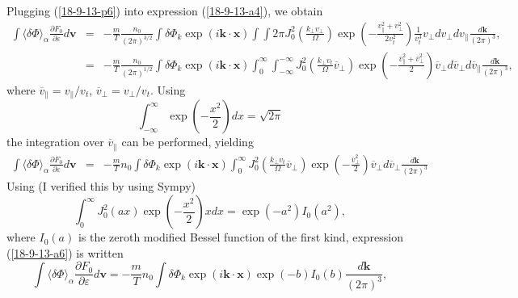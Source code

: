 \documentclass{article}
\begin{document}
Plugging (\ref{18-9-13-p6}) into expression (\ref{18-9-13-a4}), we obtain
\begin{eqnarray}
  \int \langle \delta \Phi \rangle_{\alpha} \frac{\partial F_0}{\partial
  \varepsilon} d\mathbf{v} & = & - \frac{m}{T}  \frac{n_0}{(2 \pi)^{3 / 2}}
  \int \delta \Phi_k \exp (i\mathbf{k} \cdot \mathbf{x}) \int \int 2 \pi J_0^2
  \left( \frac{k_{\perp} v_{\perp}}{\Omega} \right) \exp \left( -
  \frac{v^2_{\parallel} + v_{\perp}^2}{2 v_t^2} \right) \frac{1}{v_t^3}
  v_{\perp} d v_{\perp} d v_{\parallel} \frac{d\mathbf{k}}{(2 \pi)^3},
  \nonumber\\
  & = & - \frac{m}{T}  \frac{n_0}{(2 \pi)^{1 / 2}} \int \delta \Phi_k \exp
  (i\mathbf{k} \cdot \mathbf{x}) \int_0^{\infty} \int_{- \infty}^{- \infty}
  J_0^2 \left( \frac{k_{\perp} v_t}{\Omega}  \overline{v}_{\perp} \right) \exp
  \left( - \frac{\overline{v}_{\parallel}^2 + \overline{v}_{\perp}^2}{2}
  \right) \overline{v}_{\perp} d \overline{v}_{\perp} d
  \overline{v}_{\parallel} \frac{d\mathbf{k}}{(2 \pi)^3}, 
\end{eqnarray}
where $\overline{v}_{\parallel} = v_{\parallel} / v_t$, $\overline{v}_{\perp}
= v_{\perp} / v_t$. Using
\begin{equation}
  \int_{- \infty}^{\infty} \exp \left( - \frac{x^2}{2} \right) d x = \sqrt{2
  \pi}
\end{equation}
the integration over $\overline{v}_{\parallel}$ can be performed, yielding
\begin{eqnarray}
  \int \langle \delta \Phi \rangle_{\alpha} \frac{\partial F_0}{\partial
  \varepsilon} d\mathbf{v} & = & - \frac{m}{T} n_0 \int \delta \Phi_k \exp
  (i\mathbf{k} \cdot \mathbf{x}) \int_0^{\infty} J_0^2 \left( \frac{k_{\perp}
  v_t}{\Omega} \overline{v}_{\perp} \right) \exp \left( -
  \frac{\overline{v}_{\perp}^2}{2} \right) \overline{v}_{\perp} d
  \overline{v}_{\perp}  \frac{d\mathbf{k}}{(2 \pi)^3}  \label{18-9-13-a6}
\end{eqnarray}
Using (I verified this by using Sympy)
\begin{equation}
  \int_0^{\infty} J_0^2 (a x) \exp \left( - \frac{x^2}{2} \right) x d x = \exp
  (- a^2) I_0 (a^2),
\end{equation}
where $I_0 (a)$ is the zeroth modified Bessel function of the first kind,
expression (\ref{18-9-13-a6}) is written
\begin{equation}
  \label{18-9-13-p7} \int \langle \delta \Phi \rangle_{\alpha} \frac{\partial
  F_0}{\partial \varepsilon} d\mathbf{v}= - \frac{m}{T} n_0 \int \delta \Phi_k
  \exp (i\mathbf{k} \cdot \mathbf{x}) \exp (- b) I_0 (b) \frac{d\mathbf{k}}{(2
  \pi)^3},
\end{equation}
\end{document}
